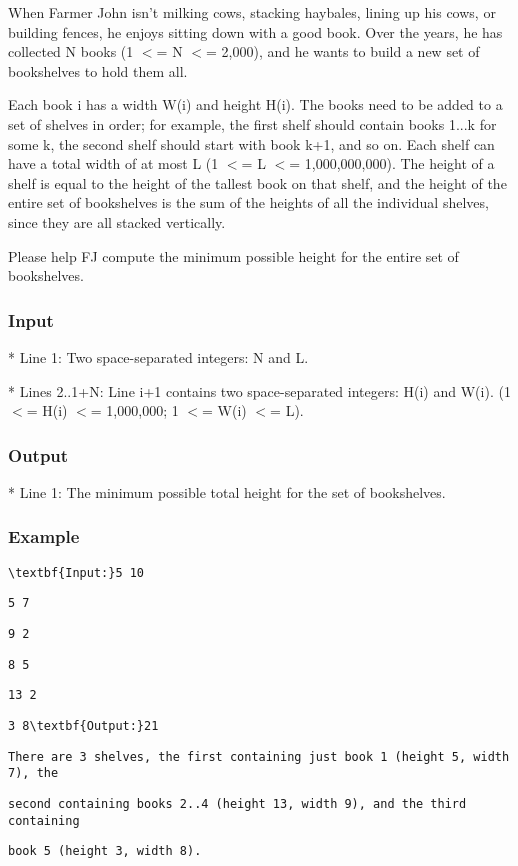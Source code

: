 

When Farmer John isn't milking cows, stacking haybales, lining up his cows, or building fences, he enjoys sitting down with a good book.  Over the years, he has collected N books (1 $<$= N $<$= 2,000), and he wants to build a new set of bookshelves to hold them all. 

Each book i has a width W(i) and height H(i).  The books need to be added to a set of shelves in order; for example, the first shelf should contain books 1...k for some k, the second shelf should start with book k+1, and so on.  Each shelf can have a total width of at most L (1 $<$= L $<$= 1,000,000,000).  The height of a shelf is equal to the height of the tallest book on that shelf, and the height of the entire set of bookshelves is the sum of the heights of all the individual shelves, since they are all stacked vertically.

Please help FJ compute the minimum possible height for the entire set of bookshelves.

\subsubsection{Input}

* Line 1: Two space-separated integers: N and L.

* Lines 2..1+N: Line i+1 contains two space-separated integers: H(i)         and W(i).  (1 $<$= H(i) $<$= 1,000,000; 1 $<$= W(i) $<$= L).

\subsubsection{Output}

* Line 1: The minimum possible total height for the set of         bookshelves.

\subsubsection{Example}
\begin{verbatim}
\textbf{Input:}5 10 \end{verbatim}
\begin{verbatim}
5 7 \end{verbatim}
\begin{verbatim}
9 2 \end{verbatim}
\begin{verbatim}
8 5 \end{verbatim}
\begin{verbatim}
13 2 \end{verbatim}
\begin{verbatim}
3 8\textbf{Output:}21\end{verbatim}
\begin{verbatim}
There are 3 shelves, the first containing just book 1 (height 5, width 7), the \end{verbatim}
\begin{verbatim}
second containing books 2..4 (height 13, width 9), and the third containing \end{verbatim}
\begin{verbatim}
book 5 (height 3, width 8).\end{verbatim}